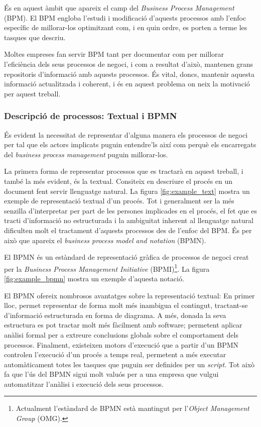 \documentclass[10pt,a4paper]{article}
\begin{document}
És en aquest àmbit que apareix el camp del \emph{Business Process Management} (BPM). El BPM engloba l'estudi i modificació d'aquests processos amb l'enfoc específic de millorar-los optimitzant com, i en quin ordre, es porten a terme les tasques que descriu.

Moltes empreses fan servir BPM tant per documentar com per millorar l'eficiència dels seus processos de negoci, i com a resultat d'això, mantenen grans repositoris d'informació amb aquests processos. És vital, doncs, mantenir aquesta informació actualitzada i coherent, i és en aquest problema on neix la motivació per aquest treball.

\subsubsection{Descripció de processos: Textual i BPMN}

És evident la necessitat de representar d'alguna manera els processos de negoci per tal que els actors implicats puguin entendre'ls així com perquè els encarregats del \emph{business process management} puguin millorar-los.

La primera forma de representar processos que es tractarà en aquest treball, i també la més evident, és la textual. Consiteix en descriure el procés en un document fent servir llenguatge natural. La figura \ref{fig:example_text} mostra un exemple de representació textual d'un procés. Tot i generalment ser la més senzilla d'interpretar \cite{text_with_bpmn} per part de les persones implicades en el procés, el fet que es tracti d'informació no estructurada i la ambiguitat inherent al llenguatge natural dificulten molt el tractament d'aquests processos des de l'enfoc del BPM. És per això que apareix el \emph{business process model and notation} (BPMN). 

El BPMN és un estàndard de representació gràfica de processos de negoci creat per la \emph{Business Process Management Initiative} (BPMI)\footnote{Actualment l'estàndard de BPMN està mantingut per l'\emph{Object Management Group} (OMG).}. La figura \ref{fig:example_bpmn} mostra un exemple d'aquesta notació. 

El BPMN ofereix nombrosos avantatges sobre la representació textual: En primer lloc, permet representar de forma molt més inambigua el contingut, tractant-se d'informació estructurada en forma de diagrama. A més, donada la seva estructura es pot tractar molt més fàcilment amb software; permetent aplicar anàlisi formal per a extreure conclusions globals sobre el comportament dels processos. Finalment, existeixen motors d'execució que a partir d'un BPMN controlen l'execució d'un procés a temps real, permetent a més executar automàticament totes les tasques que puguin ser definides per un \emph{script}. Tot això fa que l'ús del BPMN sigui molt valuós per a una empresa que vulgui automatitzar l'anàlisi i execució dels seus processos.
\end{document}
